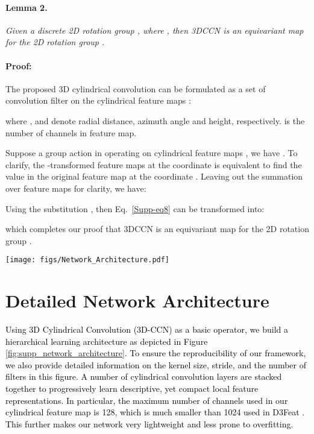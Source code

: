 \documentclass[final]{cvpr}
\newcommand{\qysupp}[1]{\textcolor{black}{#1}}
\begin{document}
\paragraph{Lemma 2.} \textit{Given a discrete 2D rotation group , where , then 3DCCN is an equivariant map for the 2D rotation group .} 

\paragraph{Proof:} The proposed 3D cylindrical convolution can be formulated as a set of convolution filter  on the cylindrical feature maps : 


where ,  and  denote radial distance, azimuth angle and height, respectively.  is the number of channels in feature map. 


Suppose a group action  in  operating on cylindrical feature maps , we have . To clarify,  the -transformed feature maps  at the coordinate  is equivalent to find the value  in the original feature map  at the coordinate . Leaving out the summation over feature maps for clarity, we have:

Using the substitution , then Eq.~\ref{Supp-eq8} can be transformed into:

which completes our proof that 3DCCN is an equivariant map for the 2D rotation group .


\begin{figure*}[thb]
	\begin{center}
		\texttt{[image: figs/Network\_Architecture.pdf]}
	\end{center}
	\caption{Detailed architecture of our proposed 3D cylindrical convolution networks.}
	\label{fig:supp_network_architecture}
\end{figure*}

\section{Detailed Network Architecture}
\qysupp{Using 3D Cylindrical Convolution (3D-CCN) as a basic operator, we build a hierarchical learning architecture as depicted in Figure \ref{fig:supp_network_architecture}. To ensure the reproducibility of our framework, we also provide detailed information on the kernel size, stride, and the number of filters in this figure. A number of cylindrical convolution layers are stacked together to progressively learn descriptive, yet compact local feature representations. In particular, the maximum number of channels used in our cylindrical feature map is 128, which is much smaller than 1024 used in D3Feat \cite{bai2020d3feat}. This further makes our network very lightweight and less prone to overfitting.}
\end{document}
